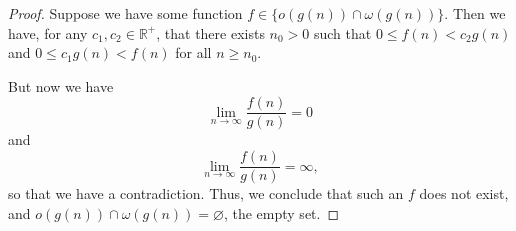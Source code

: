 \begin{proof}
  Suppose we have some function $f \in \lbrace o(g(n)) \cap
  \omega(g(n)) \rbrace$.
  Then we have, for any $c_1, c_2 \in \mathbb{R}^+$, that there exists $n_0 > 0$
  such that $0 \leq f(n) < c_2 g(n)$ and $0 \leq c_1 g(n) < f(n)$ for all
  $n \geq n_0$.

  But now we have
  \[
    \lim_{n \to \infty}{\frac{f(n)}{g(n)}} = 0
  \]
  and
  \[
    \lim_{n \to \infty}{\frac{f(n)}{g(n)}} = \infty,
  \]
  so that we have a contradiction. Thus, we conclude that such an $f$
  does not exist,
  and $o(g(n)) \cap \omega(g(n)) = \varnothing$, the empty set.
\end{proof}
